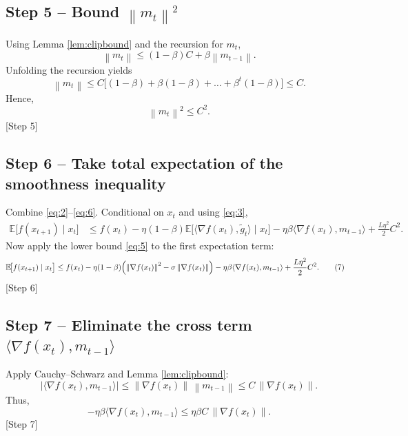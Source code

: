 \documentclass{article}
\newcommand{\EE}{\mathbb{E}}
\newcommand{\norm}[1]{\left\|#1\right\|}
\newcommand{\grad}{\nabla}
\begin{document}
\subsection*{Step 5 – Bound $\norm{m_t}^2$}
Using Lemma \ref{lem:clipbound} and the recursion for $m_t$,
\[
    \norm{m_t} \le (1-\beta)C + \beta\norm{m_{t-1}} .
\]
Unfolding the recursion yields
\[
    \norm{m_t}\le C\bigl[(1-\beta)+\beta(1-\beta)+\dots+\beta^{t}(1-\beta)\bigr]\le C .
\]
Hence,
\[
    \norm{m_t}^2\le C^2 .
\tag{6}
\]
[Step 5]

\subsection*{Step 6 – Take total expectation of the smoothness inequality}
Combine \eqref{eq:2}–\eqref{eq:6}. Conditional on $x_t$ and using \eqref{eq:3},
\begin{align}
    \EE\!\bigl[f(x_{t+1})\mid x_t\bigr]
    &\le f(x_t) -\eta(1-\beta)\EE\!\bigl[\langle\grad f(x_t),\tilde g_t\rangle\mid x_t\bigr]
          -\eta\beta\langle\grad f(x_t),m_{t-1}\rangle
          +\frac{L\eta^2}{2}C^2 .
\end{align}
Now apply the lower bound \eqref{eq:5} to the first expectation term:
\begin{align}
    \EE\!\bigl[f(x_{t+1})\mid x_t\bigr]
    &\le f(x_t) -\eta(1-\beta)\Bigl(\norm{\grad f(x_t)}^2 - \sigma\norm{\grad f(x_t)}\Bigr)
          -\eta\beta\langle\grad f(x_t),m_{t-1}\rangle
          +\frac{L\eta^2}{2}C^2 .
\tag{7}
\end{align}
[Step 6]

\subsection*{Step 7 – Eliminate the cross term $\langle\grad f(x_t),m_{t-1}\rangle$}
Apply Cauchy–Schwarz and Lemma \ref{lem:clipbound}:
\[
    |\langle\grad f(x_t),m_{t-1}\rangle|
    \le \norm{\grad f(x_t)}\,\norm{m_{t-1}}
    \le C\,\norm{\grad f(x_t)} .
\]
Thus,
\[
    -\eta\beta\langle\grad f(x_t),m_{t-1}\rangle
    \le \eta\beta C\,\norm{\grad f(x_t)} .
\tag{8}
\]
[Step 7]
\end{document}
